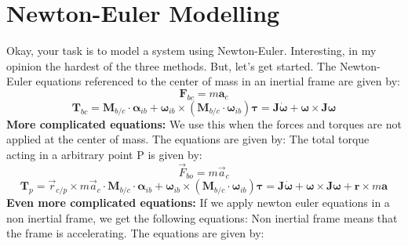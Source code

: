 \section{Newton-Euler Modelling}
Okay, your task is to model a system using Newton-Euler. Interesting, in my opinion the hardest of the three methods. But, let's get started.\newline
The Newton-Euler equations referenced to the center of mass in an inertial frame are given by:
\begin{equation}
    \mathbf{F}_{bc} = m \mathbf{a}_c
\end{equation}
\begin{subequations}
    \begin{equation}
        \mathbf{T}_{bc} = \mathbf{M}_{b/c} \cdot \boldsymbol{\alpha}_{ib} + \boldsymbol{\omega}_{ib} \times \left( \mathbf{M}_{b/c} \cdot \boldsymbol{\omega}_{ib} \right)
    \end{equation}
    \begin{equation}
        \boldsymbol{\tau} = \mathbf{J}\dot{\boldsymbol{\omega}} + \boldsymbol{\omega} \times \mathbf{J}\boldsymbol{\omega}
    \end{equation}
\end{subequations}
\textbf{More complicated equations: } \newline
We use this when the forces and torques are not applied at the center of mass. The equations are given by:
The total torque acting in a arbitrary point P is given by:
\begin{equation}
    \vec{F}_{bo} = m \vec{a}_c
\end{equation}
\begin{subequations}
    \begin{equation}
        \mathbf{T}_{p} = \vec{r}_{c/p} \times m \vec{a}_c \cdot \mathbf{M}_{b/c} \cdot \boldsymbol{\alpha}_{ib} + \boldsymbol{\omega}_{ib} \times \left( \mathbf{M}_{b/c} \cdot \boldsymbol{\omega}_{ib} \right)
    \end{equation}
    \begin{equation}
        \boldsymbol{\tau} = \mathbf{J}\dot{\boldsymbol{\omega}} + \boldsymbol{\omega} \times \mathbf{J}\boldsymbol{\omega} + \mathbf{r} \times m \mathbf{a}
    \end{equation}
\end{subequations}
\textbf{Even more complicated equations: } \newline
If we apply newton euler equations in a non inertial frame, we get the following equations:
Non inertial frame means that the frame is accelerating. The equations are given by:
